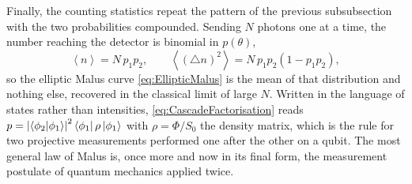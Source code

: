             Finally, the counting statistics repeat the pattern of the previous subsubsection with the two probabilities compounded. Sending $N$ photons one at a time, the number reaching the detector is binomial in $p(\theta)$,
            \begin{equation*}
                \left\langle n\right\rangle = N\,p_1p_2 , \qquad \left\langle\left(\triangle n\right)^2\right\rangle = N\,p_1p_2\left(1-p_1p_2\right) ,
            \end{equation*}
            so the elliptic Malus curve \ref{eq:EllipticMalus} is the mean of that distribution and nothing else, recovered in the classical limit of large $N$. Written in the language of states rather than intensities, \ref{eq:CascadeFactorisation} reads $p=\left|\braket{\phi_2|\phi_1}\right|^2\bra{\phi_1}\rho\ket{\phi_1}$ with $\rho=\Phi/S_0$ the density matrix, which is the rule for two projective measurements performed one after the other on a qubit. The most general law of Malus is, once more and now in its final form, the measurement postulate of quantum mechanics applied twice.
